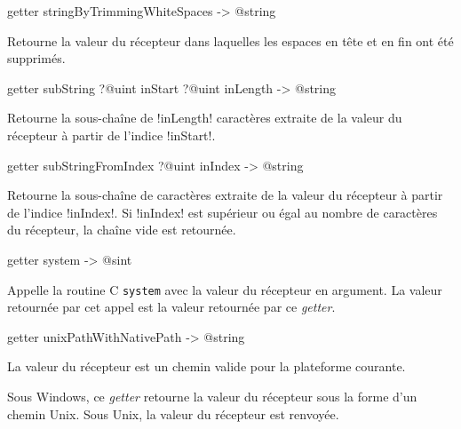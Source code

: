 
\begin{galgasbox}
getter stringByTrimmingWhiteSpaces -> @string
\end{galgasbox}

Retourne la valeur du récepteur dans laquelles les espaces en tête et en fin ont été supprimés.





\begin{galgasbox}
getter subString ?@uint inStart ?@uint inLength -> @string
\end{galgasbox}

Retourne la sous-chaîne de \ggs!inLength! caractères extraite de la valeur du récepteur à partir de l'indice \ggs!inStart!.







\begin{galgasbox}
getter subStringFromIndex ?@uint inIndex -> @string
\end{galgasbox}

Retourne la sous-chaîne de caractères extraite de la valeur du récepteur à partir de l'indice \ggs!inIndex!. Si \ggs!inIndex! est supérieur ou égal au nombre de caractères du récepteur, la chaîne vide est retournée.







\begin{galgasbox}
getter system -> @sint
\end{galgasbox}

Appelle la routine C \texttt{system} avec la valeur du récepteur en argument. La valeur retournée par cet appel est la valeur retournée par ce \emph{getter}.







\begin{galgasbox}
getter unixPathWithNativePath -> @string
\end{galgasbox}

La valeur du récepteur est un chemin valide pour la plateforme courante.

Sous Windows, ce \emph{getter} retourne la valeur du récepteur sous la forme d'un chemin Unix. Sous Unix, la valeur du récepteur est renvoyée.













